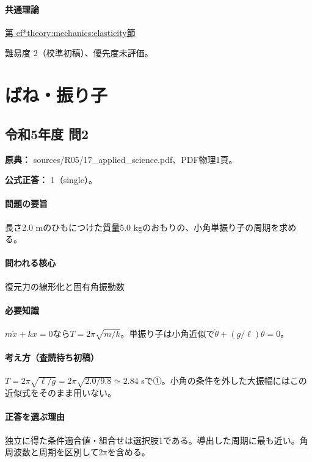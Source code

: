 \paragraph{共通理論} \hyperref[theory:mechanics:elasticity]{第
ef*{theory:mechanics:elasticity}節}

\par 難易度 2（校準初稿）、優先度未評価。

\section{ばね・振り子}

\subsection{令和5年度 問2}
\label{q:r05-reg-applied-02}

\noindent\textbf{原典：} sources/R05/17\_applied\_science.pdf、PDF物理1頁。

\textbf{公式正答：} 1（single）。

\paragraph{問題の要旨} 長さ2.0 mのひもにつけた質量5.0 kgのおもりの、小角単振り子の周期を求める。

\paragraph{問われる核心} 復元力の線形化と固有角振動数

\paragraph{必要知識} \(m\ddot x+kx=0\)なら\(T=2\pi\sqrt{m/k}\)。単振り子は小角近似で\(\ddot\theta+(g/\ell)\theta=0\)。

\paragraph{考え方（査読待ち初稿）} \(T=2\pi\sqrt{\ell/g}=2\pi\sqrt{2.0/9.8}\simeq2.84\) sで①。小角の条件を外した大振幅にはこの近似式をそのまま用いない。

\paragraph{正答を選ぶ理由} 独立に得た条件適合値・組合せは選択肢1である。導出した周期に最も近い。角周波数と周期を区別して2πを含める。

